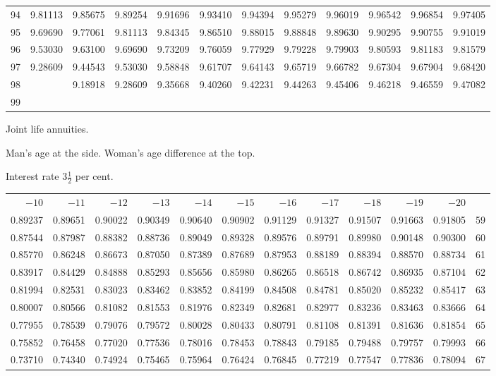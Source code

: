 \begin{center}
\begin{tabular}{|r|rrrrrrrrrrr|}
94&9.81113&9.85675&9.89254&9.91696&9.93410&9.94394&9.95279&9.96019&9.96542&9.96854&9.97405\\[5pt]
95&9.69690&9.77061&9.81113&9.84345&9.86510&9.88015&9.88848&9.89630&9.90295&9.90755&9.91019\\
96&9.53030&9.63100&9.69690&9.73209&9.76059&9.77929&9.79228&9.79903&9.80593&9.81183&9.81579\\
97&9.28609&9.44543&9.53030&9.58848&9.61707&9.64143&9.65719&9.66782&9.67304&9.67904&9.68420\\
98&&9.18918&9.28609&9.35668&9.40260&9.42231&9.44263&9.45406&9.46218&9.46559&9.47082\\
99&&&&&&&&&&&\\
\hline\end{tabular}
\end{center}
\clearpage
{}
\begin{center}
Joint life annuities.\par\smallskip
Man's age at the side. Woman's age difference at the top.\par\smallskip
Interest rate \(3\tfrac{1}{2}\) per cent.\par\medskip
\fontsize{8}{10}\selectfont\setlength{\tabcolsep}{1.3pt}
\begin{tabular}{|rrrrrrrrrrr|r|}
\hline
\(-10\)&\(-11\)&\(-12\)&\(-13\)&\(-14\)&\(-15\)&\(-16\)&\(-17\)&\(-18\)&\(-19\)&\(-20\)&\\[8pt]
0.89237&0.89651&0.90022&0.90349&0.90640&0.90902&0.91129&0.91327&0.91507&0.91663&0.91805&59\\
0.87544&0.87987&0.88382&0.88736&0.89049&0.89328&0.89576&0.89791&0.89980&0.90148&0.90300&60\\
0.85770&0.86248&0.86673&0.87050&0.87389&0.87689&0.87953&0.88189&0.88394&0.88570&0.88734&61\\
0.83917&0.84429&0.84888&0.85293&0.85656&0.85980&0.86265&0.86518&0.86742&0.86935&0.87104&62\\
0.81994&0.82531&0.83023&0.83462&0.83852&0.84199&0.84508&0.84781&0.85020&0.85232&0.85417&63\\
0.80007&0.80566&0.81082&0.81553&0.81976&0.82349&0.82681&0.82977&0.83236&0.83463&0.83666&64\\[5pt]
0.77955&0.78539&0.79076&0.79572&0.80028&0.80433&0.80791&0.81108&0.81391&0.81636&0.81854&65\\
0.75852&0.76458&0.77020&0.77536&0.78016&0.78453&0.78843&0.79185&0.79488&0.79757&0.79993&66\\
0.73710&0.74340&0.74924&0.75465&0.75964&0.76424&0.76845&0.77219&0.77547&0.77836&0.78094&67\\

\end{tabular}
\end{center}
